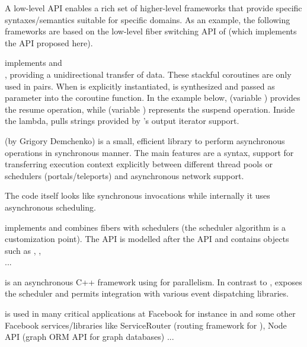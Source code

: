 \label{low_level}

A low-level API enables a rich set of higher-level frameworks that provide
specific syntaxes/semantics suitable for specific domains. As an example, the
following frameworks are based on the low-level fiber switching API of
\bcontext\cite{bcontext} (which implements the API proposed here).

\uabschnitt{\bcoroutine}\cite{bcoroutine2} implements 
 and\\
, providing a
unidirectional transfer of data. These stackful coroutines are only used in
pairs. When  is explicitly
instantiated,  is synthesized and passed as
parameter into the coroutine function. In the
example below,  (variable ) provides the
resume operation, while  (variable )
represents the suspend operation. Inside the lambda,
pulls strings provided by 's output iterator support.

\uabschnitt{\synca}\cite{synca} (by Grigory Demchenko) is a small, efficient
library to perform asynchronous operations in synchronous manner. The main
features are a  syntax, support for transferring execution context
explicitly between different thread pools or schedulers (portals/teleports) and
asynchronous network support.

The code itself looks like synchronous invocations while internally it uses
asynchronous scheduling.

\uabschnitt{\bfiber}\cite{bfiber} implements  and combines
fibers with schedulers (the scheduler algorithm is a customization point). The API
is modelled after the \thread API and contains objects such as
, ,\\
 ...

\cite{fbfiber} is an asynchronous C++ framework
using  for parallelism. In contrast to \bfiber,
\fbfibers\xspace exposes the scheduler and permits integration with various
event dispatching libraries.

\fbfibers\xspace is used in many critical applications at Facebook for instance
in \fbmcrouter\cite{fbmcrouter} and some other Facebook services/libraries like
ServiceRouter (routing framework for \fbthrift\cite{fbthrift}), Node API (graph
ORM API for graph databases) ...

